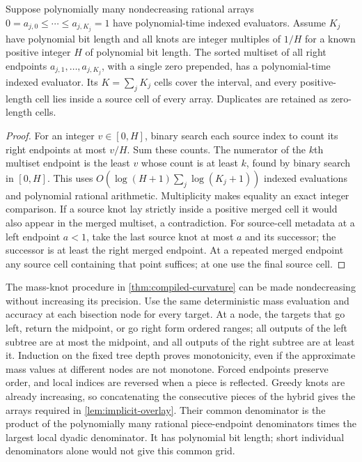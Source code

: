 \begin{lemma}\label{lem:implicit-overlay}
Suppose polynomially many nondecreasing rational arrays
$0=a_{j,0}\le\cdots\le a_{j,K_j}=1$ have polynomial-time indexed
evaluators. Assume $K_j$ have polynomial bit length and all knots are
integer multiples of $1/H$ for a known positive integer $H$ of polynomial
bit length. The sorted multiset of all right endpoints
$a_{j,1},\ldots,a_{j,K_j}$, with a single zero prepended, has a
polynomial-time indexed evaluator. Its $K=\sum_jK_j$ cells cover the
interval, and every positive-length cell lies inside a source cell
of every array. Duplicates are retained as zero-length cells.
\end{lemma}
\begin{proof}
For an integer $v\in[0,H]$, binary search each source index to count
its right endpoints at most $v/H$. Sum these counts. The numerator
of the $k$th multiset endpoint is the least $v$ whose count is at
least $k$, found by binary search in $[0,H]$. This uses
$O(\log(H+1)\sum_j\log(K_j+1))$ indexed evaluations and polynomial
rational arithmetic. Multiplicity makes equality an exact integer
comparison. If a source knot lay strictly inside a positive merged
cell it would also appear in the merged multiset, a contradiction.
For source-cell metadata at a left endpoint $a<1$, take the last source
knot at most $a$ and its successor; the successor is at least the right
merged endpoint. At a repeated merged endpoint any source cell
containing that point suffices; at one use the final source cell.
\end{proof}

The mass-knot procedure in \cref{thm:compiled-curvature} can be made
nondecreasing without increasing its precision. Use the same deterministic
mass evaluation and accuracy at each bisection node for every target.
At a node, the targets that go left, return the midpoint, or go right
form ordered ranges; all outputs of the left subtree are at most the
midpoint, and all outputs of the right subtree are at least it. Induction
on the fixed tree depth proves monotonicity, even if the approximate mass
values at different nodes are not monotone. Forced endpoints preserve
order, and local indices are reversed when a piece is reflected. Greedy
knots are already increasing, so concatenating the consecutive pieces of
the hybrid gives the arrays required in \cref{lem:implicit-overlay}.
Their common denominator is the product of the polynomially many rational
piece-endpoint denominators times the largest local dyadic denominator.
It has polynomial bit length; short individual denominators alone would
not give this common grid.

